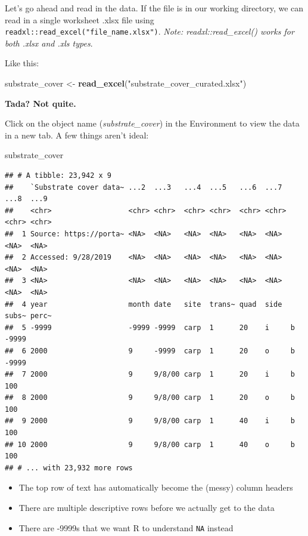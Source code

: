\documentclass[]{book}
\newenvironment{Shaded}{\begin{snugshade}}{\end{snugshade}}
\newcommand{\KeywordTok}[1]{\textcolor[rgb]{0.13,0.29,0.53}{\textbf{#1}}}
\newcommand{\NormalTok}[1]{#1}
\newcommand{\StringTok}[1]{\textcolor[rgb]{0.31,0.60,0.02}{#1}}
\providecommand{\tightlist}{%
  \setlength{\itemsep}{0pt}\setlength{\parskip}{0pt}}
\begin{document}
Let's go ahead and read in the data. If the file is in our working directory, we can read in a single worksheet .xlsx file using \texttt{readxl::read\_excel("file\_name.xlsx")}. \emph{Note: readxl::read\_excel() works for both .xlsx and .xls types}.

Like this:

\begin{Shaded}
\begin{Highlighting}[]
\NormalTok{substrate_cover <-}\StringTok{ }\KeywordTok{read_excel}\NormalTok{(}\StringTok{"substrate_cover_curated.xlsx"}\NormalTok{)}
\end{Highlighting}
\end{Shaded}

\textbf{Tada? Not quite.}

Click on the object name (\emph{substrate\_cover}) in the Environment to view the data in a new tab. A few things aren't ideal:

\begin{Shaded}
\begin{Highlighting}[]
\NormalTok{substrate_cover}
\end{Highlighting}
\end{Shaded}

\begin{verbatim}
## # A tibble: 23,942 x 9
##    `Substrate cover data~ ...2  ...3   ...4  ...5   ...6  ...7  ...8  ...9 
##    <chr>                  <chr> <chr>  <chr> <chr>  <chr> <chr> <chr> <chr>
##  1 Source: https://porta~ <NA>  <NA>   <NA>  <NA>   <NA>  <NA>  <NA>  <NA> 
##  2 Accessed: 9/28/2019    <NA>  <NA>   <NA>  <NA>   <NA>  <NA>  <NA>  <NA> 
##  3 <NA>                   <NA>  <NA>   <NA>  <NA>   <NA>  <NA>  <NA>  <NA> 
##  4 year                   month date   site  trans~ quad  side  subs~ perc~
##  5 -9999                  -9999 -9999  carp  1      20    i     b     -9999
##  6 2000                   9     -9999  carp  1      20    o     b     -9999
##  7 2000                   9     9/8/00 carp  1      20    i     b     100  
##  8 2000                   9     9/8/00 carp  1      20    o     b     100  
##  9 2000                   9     9/8/00 carp  1      40    i     b     100  
## 10 2000                   9     9/8/00 carp  1      40    o     b     100  
## # ... with 23,932 more rows
\end{verbatim}

\begin{itemize}
\tightlist
\item
  The top row of text has automatically become the (messy) column headers
\item
  There are multiple descriptive rows before we actually get to the data
\item
  There are -9999s that we want R to understand \texttt{NA} instead
\end{itemize}
\end{document}
